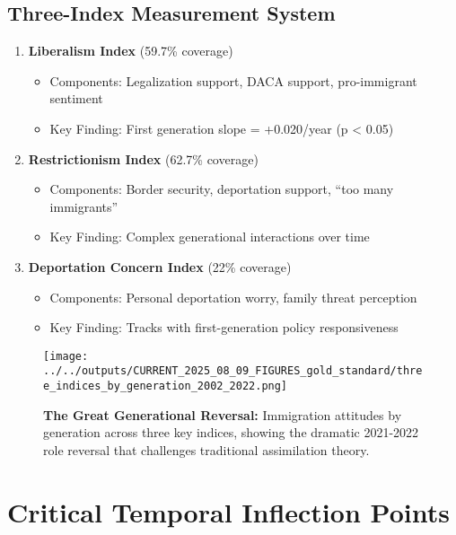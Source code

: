 \documentclass[11pt,letterpaper]{article}
\begin{document}
\subsection{Three-Index Measurement System}
\begin{enumerate}
    \item \textbf{Liberalism Index} (59.7\% coverage)
        \begin{itemize}
            \item Components: Legalization support, DACA support, pro-immigrant sentiment
            \item Key Finding: First generation slope = +0.020/year (p < 0.05)
        \end{itemize}
        
    \item \textbf{Restrictionism Index} (62.7\% coverage)
        \begin{itemize}
            \item Components: Border security, deportation support, ``too many immigrants''
            \item Key Finding: Complex generational interactions over time
        \end{itemize}
        
    \item \textbf{Deportation Concern Index} (22\% coverage)
        \begin{itemize}
            \item Components: Personal deportation worry, family threat perception
            \item Key Finding: Tracks with first-generation policy responsiveness
        \end{itemize}
\end{enumerate}

\begin{figure}[H]
    \centering
    \texttt{[image: ../../outputs/CURRENT\_2025\_08\_09\_FIGURES\_gold\_standard/three\_indices\_by\_generation\_2002\_2022.png]}
    \caption{\textbf{The Great Generational Reversal:} Immigration attitudes by generation across three key indices, showing the dramatic 2021-2022 role reversal that challenges traditional assimilation theory.}
    \label{fig:three_indices}
\end{figure}

\section{Critical Temporal Inflection Points}
\end{document}
